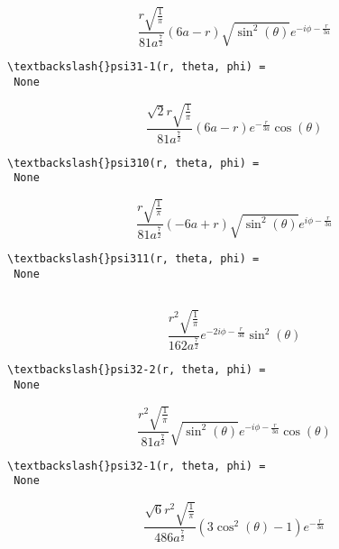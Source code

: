 \documentclass[11pt]{article}
\begin{document}
    $$\frac{r \sqrt{\frac{1}{\pi}}}{81 a^{\frac{7}{2}}} \left(6 a - r\right) \sqrt{\sin^{2}{\left (\theta \right )}} e^{- i \phi - \frac{r}{3 a}}$$

    
    \begin{Verbatim}[commandchars=\\\{\}]
\textbackslash{}psi31-1(r, theta, phi) = 
 None

    \end{Verbatim}

    $$\frac{\sqrt{2} r \sqrt{\frac{1}{\pi}}}{81 a^{\frac{7}{2}}} \left(6 a - r\right) e^{- \frac{r}{3 a}} \cos{\left (\theta \right )}$$

    
    \begin{Verbatim}[commandchars=\\\{\}]
\textbackslash{}psi310(r, theta, phi) = 
 None

    \end{Verbatim}

    $$\frac{r \sqrt{\frac{1}{\pi}}}{81 a^{\frac{7}{2}}} \left(- 6 a + r\right) \sqrt{\sin^{2}{\left (\theta \right )}} e^{i \phi - \frac{r}{3 a}}$$

    
    \begin{Verbatim}[commandchars=\\\{\}]
\textbackslash{}psi311(r, theta, phi) = 
 None


    \end{Verbatim}

    $$\frac{r^{2} \sqrt{\frac{1}{\pi}}}{162 a^{\frac{7}{2}}} e^{- 2 i \phi - \frac{r}{3 a}} \sin^{2}{\left (\theta \right )}$$

    
    \begin{Verbatim}[commandchars=\\\{\}]
\textbackslash{}psi32-2(r, theta, phi) = 
 None

    \end{Verbatim}

    $$\frac{r^{2} \sqrt{\frac{1}{\pi}}}{81 a^{\frac{7}{2}}} \sqrt{\sin^{2}{\left (\theta \right )}} e^{- i \phi - \frac{r}{3 a}} \cos{\left (\theta \right )}$$

    
    \begin{Verbatim}[commandchars=\\\{\}]
\textbackslash{}psi32-1(r, theta, phi) = 
 None

    \end{Verbatim}

    $$\frac{\sqrt{6} r^{2} \sqrt{\frac{1}{\pi}}}{486 a^{\frac{7}{2}}} \left(3 \cos^{2}{\left (\theta \right )} - 1\right) e^{- \frac{r}{3 a}}$$
\end{document}
